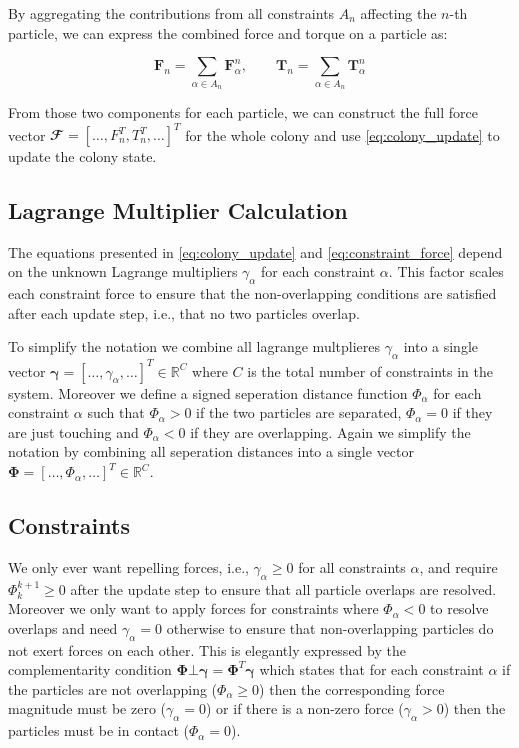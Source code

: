 \documentclass[conference]{IEEEtran}
\begin{document}
By aggregating the contributions from all constraints $A_n$ affecting the $n$-th particle, we can express the combined force and torque on a particle as:

$$
    \mathbf{F}_n = \sum_{\alpha \in A_n} \mathbf{F}_\alpha^n, \qquad \mathbf{T}_n = \sum_{\alpha \in A_n} \mathbf{T}_\alpha^n
$$
\label{eq:total_force}

From those two components for each particle, we can construct the full force vector $\mathbfcal{F} = [ \dots, F_n^T, T_n^T, \dots]^T$ for the whole colony and use \autoref{eq:colony_update} to update the colony state.


\subsection{Lagrange Multiplier Calculation}

The equations presented in \autoref{eq:colony_update} and \autoref{eq:constraint_force} depend on the unknown Lagrange multipliers $\gamma_\alpha$ for each constraint $\alpha$. This factor scales each constraint force to ensure that the non-overlapping conditions are satisfied after each update step, i.e., that no two particles overlap.

To simplify the notation we combine all lagrange multplieres $\gamma_\alpha$ into a single vector $\mathbf{\gamma} = [\dots, \gamma_\alpha, \dots]^T \in \mathbb{R}^{C}$ where $C$ is the total number of constraints in the system. Moreover we define a signed seperation distance function $\Phi_{\alpha}$ for each constraint $\alpha$ such that $\Phi_{\alpha} > 0$ if the two particles are separated, $\Phi_{\alpha} = 0$ if they are just touching and $\Phi_{\alpha} < 0$ if they are overlapping. Again we simplify the notation by combining all seperation distances into a single vector $\mathbf{\Phi} = [\dots, \Phi_\alpha, \dots]^T \in \mathbb{R}^{C}$.


\subsection{Constraints}

We only ever want repelling forces, i.e., $\gamma_\alpha \geq 0$ for all constraints $\alpha$, and require $\Phi_{k}^{k+1} \geq 0$ after the update step to ensure that all particle overlaps are resolved. Moreover we only want to apply forces for constraints where $\Phi_{\alpha} < 0$ to resolve overlaps and need $\gamma_\alpha = 0$ otherwise to ensure that non-overlapping particles do not exert forces on each other. This is elegantly expressed by the complementarity condition $\mathbf{\Phi} \bot \mathbf{\gamma} = \mathbf{\Phi}^T \mathbf{\gamma}$ which states that for each constraint $\alpha$ if the particles are not overlapping ($\Phi_\alpha \geq 0$) then the corresponding force magnitude must be zero ($\gamma_\alpha = 0$) or if there is a non-zero force ($\gamma_\alpha > 0$) then the particles must be in contact ($\Phi_\alpha = 0$).
\end{document}
